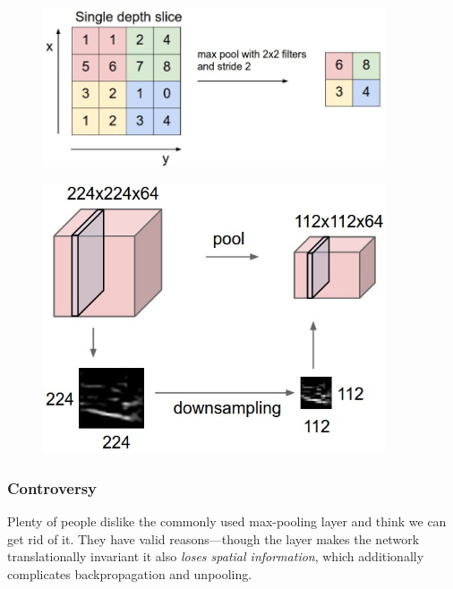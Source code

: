 \documentclass{article}
\begin{document}
\begin{figure}[!htb]
\centering
\begin{minipage}{0.6\textwidth}
  \centering
  \includegraphics[width=0.9\textwidth]{maxpool.jpeg}
  \label{fig:test3}
\end{minipage}%
\begin{minipage}{0.4\textwidth}
  \centering
  \includegraphics[width=0.9\textwidth]{pool_layer.jpeg}
  \label{fig:test4}
\end{minipage}
\end{figure}

\subsubsection{Controversy}
Plenty of people dislike the commonly used max-pooling layer and think we can get rid of it. They have valid reasons—though the layer makes the network translationally invariant it also \textit{loses spatial information}, which additionally complicates backpropagation and unpooling.
\end{document}
